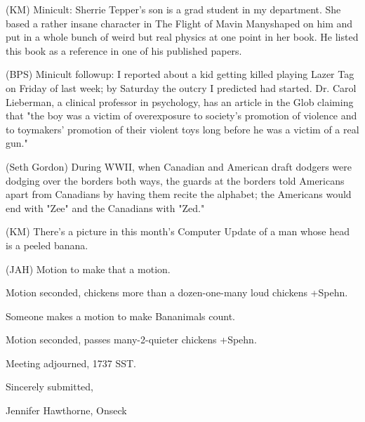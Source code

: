 \documentclass[12pt]{article}
\begin{document}
(KM) Minicult: Sherrie Tepper's son is a grad student in my department. She based a rather insane character in The Flight of Mavin Manyshaped on him and put in a whole bunch of weird but real physics at one point in her book. He listed this book as a reference in one of his published papers.

(BPS) Minicult followup: I reported about a kid getting killed playing Lazer Tag on Friday of last week; by Saturday the outcry I predicted had started. Dr. Carol Lieberman, a clinical professor in psychology, has an article in the Glob claiming that "the boy was a victim of overexposure to society's promotion of violence and to toymakers' promotion of their violent toys long before he was a victim of a real gun."

(Seth Gordon) During WWII, when Canadian and American draft dodgers were dodging over the borders both ways, the guards at the borders told Americans apart from Canadians by having them recite the alphabet; the Americans would end with "Zee" and the Canadians with "Zed."

(KM) There's a picture in this month's Computer Update of a man whose head is a peeled banana.

(JAH) Motion to make that a motion.

Motion seconded, chickens more than a dozen-one-many loud chickens +Spehn.

Someone makes a motion to make Bananimals count.

Motion seconded, passes many-2-quieter chickens +Spehn.

\vspace{12pt}

\noindent
Meeting adjourned, 1737 SST.

\vspace{18pt}

\centerline{Sincerely submitted,}
\centerline{Jennifer Hawthorne, Onseck}
\end{document}
